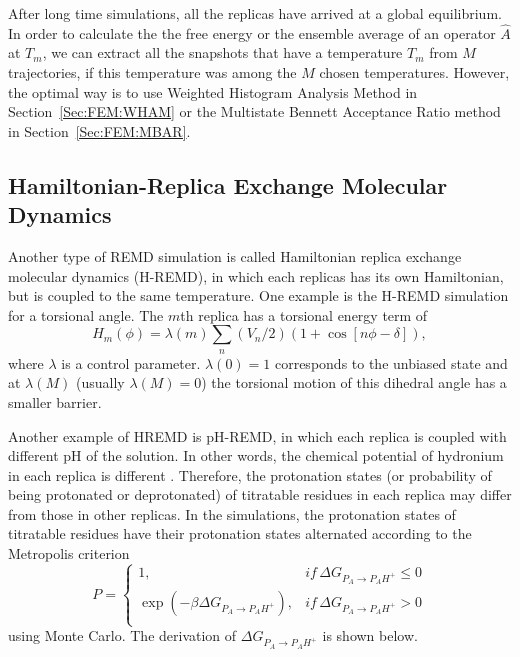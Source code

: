 After long time simulations, all the replicas have arrived at a global equilibrium. In order to calculate the the free energy or the ensemble average of an operator $\hat A$ at $T_m$, we can extract all the snapshots that have a temperature $T_m$ from $M$ trajectories, if this temperature was among the $M$ chosen temperatures. However, the optimal way is to use Weighted Histogram Analysis Method in Section~\ref{Sec:FEM:WHAM} or the Multistate Bennett Acceptance Ratio method in Section~\ref{Sec:FEM:MBAR}.  

\subsection{Hamiltonian-Replica Exchange Molecular Dynamics}
Another type of REMD simulation is called Hamiltonian replica exchange molecular dynamics (H-REMD), in which each replicas has its own Hamiltonian, but is coupled to the same temperature. One example is the H-REMD simulation for a torsional angle. The $m$th replica has a torsional energy term of 
\begin{equation}
	H_m(\phi)=\lambda(m)\sum_n\left(V_n/2\right)\left(1+\cos{\left[n\phi-\delta\right]}\right),
\end{equation}
where $\lambda$ is a control parameter. $\lambda(0)=1$ corresponds to the unbiased state and at $\lambda(M)$ (usually $\lambda(M)=0$) the torsional motion of this dihedral angle has a smaller barrier.

Another example of HREMD is pH-REMD, in which each replica is coupled with different pH of the solution. In other words, the chemical potential of hydronium in each replica is different . Therefore, the protonation states (or probability of being protonated or deprotonated) of titratable residues in each replica may differ from those in other replicas. In the simulations, the protonation states of titratable residues have their protonation states alternated according to the Metropolis criterion
\begin{equation}
	P= 
	\left\{ 
	\begin{array}{ll} 
		1, & if\, \Delta G_{P_{A}\rightarrow P_{A}H^{+}}\leq 0\\ 
		\exp{(-\beta\Delta G_{P_{A}\rightarrow P_{A}H^{+}})}, & if \,\Delta G_{P_{A}\rightarrow P_{A}H^{+}} >0\\  
	\end{array} 
	\right. 
\end{equation}
using Monte Carlo. The derivation of $\Delta G_{P_{A}\rightarrow P_{A}H^{+}}$ is shown below. 

